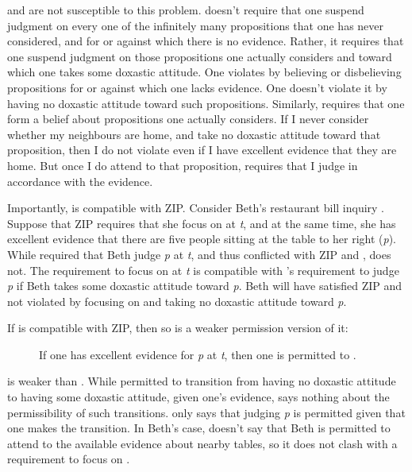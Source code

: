 \documentclass[12pt]{article}
\begin{document}
\eoc{} and \soc{} are not susceptible to this problem. \soc{} doesn't require that one suspend judgment on every one of the infinitely many propositions that one has never considered, and for or against which there is no evidence. Rather, it requires that one suspend judgment on those propositions one actually considers and toward which one takes some doxastic attitude. One violates \soc{} by believing or disbelieving propositions for or against which one lacks evidence. One doesn't violate it by having no doxastic attitude toward such propositions. Similarly, \eoc{} requires that one form a belief about propositions one actually considers. If I never consider whether my neighbours are home, and take no doxastic attitude toward that proposition, then I do not violate \eoc{} even if I have excellent evidence that they are home. But once I do attend to that proposition, \eoc{} requires that I judge in accordance with the evidence.

Importantly, \eoc{} is compatible with ZIP. Consider Beth's restaurant bill inquiry . Suppose that ZIP requires that she focus on  at \textit{t}, and at the same time, she has excellent evidence that there are five people sitting at the table to her right (\textit{p}). While \eo{} required that Beth judge \textit{p} at \textit{t}, and thus conflicted with ZIP and \js{}, \eoc{} does not. The requirement to focus on  at \textit{t} is compatible with \eoc{}'s requirement to judge \textit{p} if Beth takes some doxastic attitude toward \textit{p}. Beth will have satisfied ZIP and not violated \eoc{} by focusing on  and taking no doxastic attitude toward \textit{p}.

If \eoc{} is compatible with ZIP, then so is a weaker permission version of it:

\begin{description}
    \item[\epc] If one has excellent evidence for \textit{p} at \textit{t}, then one is permitted to \judif{}.
\end{description}
%
\epc{} is weaker than \ep{}. While \ep{} permitted to transition from having no doxastic attitude to having some doxastic attitude, given one's evidence, \epc{} says nothing about the permissibility of such transitions. \epc{} only says that judging \textit{p} is permitted given that one makes the transition. In Beth's case, \epc{} doesn't say that Beth is permitted to attend to the available evidence about nearby tables, so it does not clash with a requirement to focus on .
\end{document}
